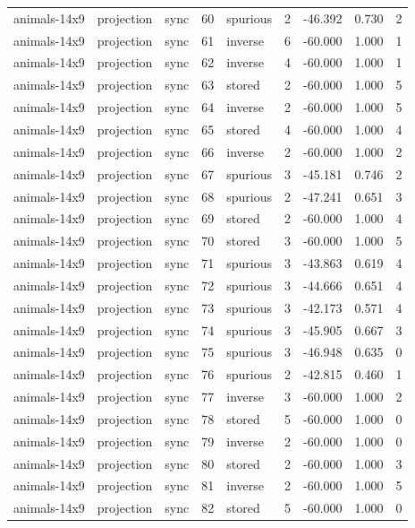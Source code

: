\begin{tabular}{lllrlrrrr}
animals-14x9 & projection & sync & 60 & spurious & 2 & -46.392 & 0.730 & 2 \\
animals-14x9 & projection & sync & 61 & inverse & 6 & -60.000 & 1.000 & 1 \\
animals-14x9 & projection & sync & 62 & inverse & 4 & -60.000 & 1.000 & 1 \\
animals-14x9 & projection & sync & 63 & stored & 2 & -60.000 & 1.000 & 5 \\
animals-14x9 & projection & sync & 64 & inverse & 2 & -60.000 & 1.000 & 5 \\
animals-14x9 & projection & sync & 65 & stored & 4 & -60.000 & 1.000 & 4 \\
animals-14x9 & projection & sync & 66 & inverse & 2 & -60.000 & 1.000 & 2 \\
animals-14x9 & projection & sync & 67 & spurious & 3 & -45.181 & 0.746 & 2 \\
animals-14x9 & projection & sync & 68 & spurious & 2 & -47.241 & 0.651 & 3 \\
animals-14x9 & projection & sync & 69 & stored & 2 & -60.000 & 1.000 & 4 \\
animals-14x9 & projection & sync & 70 & stored & 3 & -60.000 & 1.000 & 5 \\
animals-14x9 & projection & sync & 71 & spurious & 3 & -43.863 & 0.619 & 4 \\
animals-14x9 & projection & sync & 72 & spurious & 3 & -44.666 & 0.651 & 4 \\
animals-14x9 & projection & sync & 73 & spurious & 3 & -42.173 & 0.571 & 4 \\
animals-14x9 & projection & sync & 74 & spurious & 3 & -45.905 & 0.667 & 3 \\
animals-14x9 & projection & sync & 75 & spurious & 3 & -46.948 & 0.635 & 0 \\
animals-14x9 & projection & sync & 76 & spurious & 2 & -42.815 & 0.460 & 1 \\
animals-14x9 & projection & sync & 77 & inverse & 3 & -60.000 & 1.000 & 2 \\
animals-14x9 & projection & sync & 78 & stored & 5 & -60.000 & 1.000 & 0 \\
animals-14x9 & projection & sync & 79 & inverse & 2 & -60.000 & 1.000 & 0 \\
animals-14x9 & projection & sync & 80 & stored & 2 & -60.000 & 1.000 & 3 \\
animals-14x9 & projection & sync & 81 & inverse & 2 & -60.000 & 1.000 & 5 \\
animals-14x9 & projection & sync & 82 & stored & 5 & -60.000 & 1.000 & 0 \\

\end{tabular}
